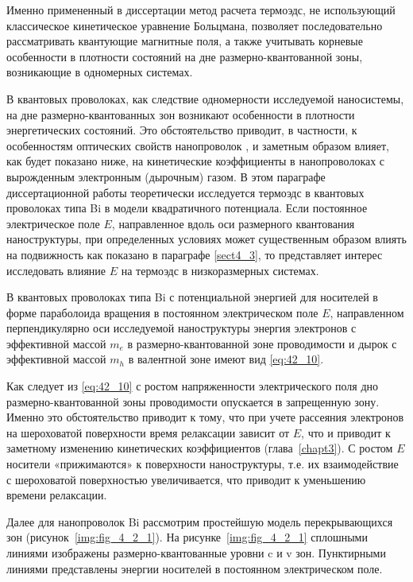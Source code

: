 Именно примененный в диссертации метод расчета термоэдс, не использующий классическое кинетическое уравнение Больцмана, позволяет последовательно рассматривать квантующие магнитные поля, а также учитывать корневые особенности в плотности состояний на дне размерно-квантованной зоны, возникающие в одномерных системах.

В квантовых проволоках, как следствие одномерности исследуемой наносистемы, на дне размерно-квантованных зон возникают особенности в плотности энергетических состояний. Это обстоятельство приводит, в частности, к особенностям оптических свойств нанопроволок \cite{Black2003a,Black2000,Black2002,Levin2009a}, и заметным образом влияет, как будет показано ниже, на кинетические коэффициенты в нанопроволоках с вырожденным электронным (дырочным) газом. В этом параграфе диссертационной работы теоретически исследуется термоэдс в квантовых проволоках типа Bi в модели квадратичного потенциала. Если постоянное электрическое поле $E$, направленное вдоль оси размерного квантования наноструктуры, при определенных условиях может существенным образом влиять на подвижность как показано в параграфе \ref{sect4_3}, то представляет интерес исследовать влияние $E$ на термоэдс в низкоразмерных системах.
 
В квантовых проволоках типа Bi с потенциальной энергией для носителей в форме параболоида вращения в постоянном электрическом поле $E$, направленном перпендикулярно оси исследуемой наноструктуры энергия электронов с эффективной массой $m_e $ в размерно-квантованной зоне проводимости и дырок с эффективной массой $m_h$ в валентной зоне имеют вид \eqref{eq:42_10}.
 
Как следует из \eqref{eq:42_10} с ростом напряженности электрического поля дно размерно-квантованной зоны проводимости опускается в запрещенную зону. Именно это обстоятельство приводит к тому, что при учете рассеяния электронов на шероховатой поверхности время релаксации зависит от $E$, что и приводит к заметному изменению кинетических коэффициентов (глава~\ref{chapt3}). С ростом $E$ носители «прижимаются» к поверхности наноструктуры, т.е. их взаимодействие с шероховатой поверхностью увеличивается, что приводит к уменьшению времени релаксации. 
  
Далее для нанопроволок Bi рассмотрим простейшую модель перекрывающихся зон (рисунок~\ref{img:fig_4_2_1}). На рисунке~\ref{img:fig_4_2_1} сплошными линиями изображены  размерно-квантованные уровни c и v зон. Пунктирными линиями представлены энергии носителей в постоянном электрическом поле.

